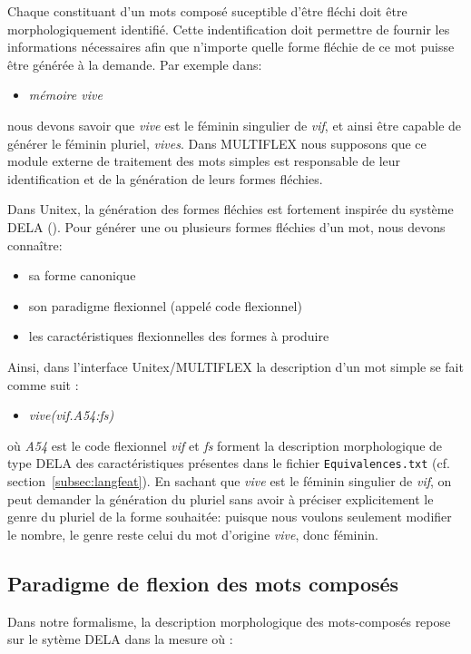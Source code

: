 \bigskip
\noindent Chaque constituant d'un mots composé suceptible d'être fléchi doit être morphologiquement 
identifié. Cette indentification doit permettre de fournir les informations nécessaires afin que
n'importe quelle forme fléchie de ce mot puisse être générée à la demande. Par exemple dans:
\begin{itemize}
\item \emph{mémoire vive}
\end{itemize} 
nous devons savoir que \emph{vive} est le féminin singulier de \emph{vif}, et ainsi être capable de
générer le féminin pluriel, \emph{vives}. Dans MULTIFLEX nous supposons que ce module externe de
traitement des mots simples est responsable de leur identification et de la génération de leurs
formes fléchies.

\bigskip
\noindent Dans Unitex, la génération des formes fléchies est fortement inspirée du système DELA
(\cite{dicos-francais}). Pour générer une ou plusieurs formes fléchies d'un mot, nous devons
connaître:

\begin{itemize}
\item sa forme canonique
\item son paradigme flexionnel (appelé code flexionnel)
\item les caractéristiques flexionnelles des formes à produire
\end{itemize}

\bigskip
\noindent Ainsi, dans l'interface Unitex/MULTIFLEX la description d'un mot simple se fait comme suit
:

\begin{itemize}
\item \emph{vive(vif.A54:fs)}
\end{itemize} 

\bigskip
\noindent où \emph{A54} est le code flexionnel \emph{vif} et \emph{fs} forment la description
morphologique de type DELA des caractéristiques présentes dans le fichier \verb+Equivalences.txt+
(cf. section~\ref{subsec:langfeat}). En sachant que \emph{vive} est le féminin singulier de
\emph{vif}, on peut demander la génération du pluriel sans avoir à préciser explicitement le genre
du pluriel de la forme souhaitée: puisque nous voulons seulement modifier le nombre, le genre reste
celui du mot d'origine \emph{vive}, donc féminin.

\subsection{Paradigme de flexion des mots composés}
\label{subsec:paradigm}
Dans notre formalisme, la description morphologique des mots-composés repose sur le sytème DELA dans
la mesure où :

